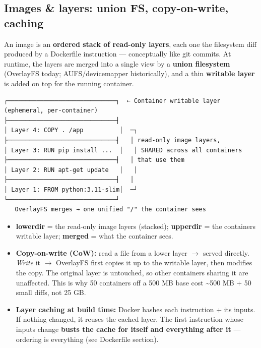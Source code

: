 \documentclass[11pt]{article}
\providecommand{\tightlist}{\setlength{\itemsep}{1pt}\setlength{\parskip}{0pt}}
\begin{document}
\subsection{Images \& layers: union FS, copy-on-write, caching}\label{images--layers-union-fs-copy-on-write-caching}

An image is an \textbf{ordered stack of read-only layers}, each one the filesystem diff produced by a Dockerfile instruction --- conceptually like git commits. At runtime, the layers are merged into a single view by a \textbf{union filesystem} (OverlayFS today; AUFS/devicemapper historically), and a thin \textbf{writable layer} is added on top for the running container.

\setcodelang{}

\begin{verbatim}
┌──────────────────────────────┐  ← Container writable layer (ephemeral, per-container)
├──────────────────────────────┤
│ Layer 4: COPY . /app          │  ─┐
├──────────────────────────────┤   │ read-only image layers,
│ Layer 3: RUN pip install ...  │   │ SHARED across all containers
├──────────────────────────────┤   │ that use them
│ Layer 2: RUN apt-get update   │   │
├──────────────────────────────┤   │
│ Layer 1: FROM python:3.11-slim│  ─┘
└──────────────────────────────┘
   OverlayFS merges → one unified "/" the container sees
\end{verbatim}

\begin{itemize}
\tightlist
\item
  \textbf{lowerdir} = the read-only image layers (stacked); \textbf{upperdir} = the container\textquotesingle s writable layer; \textbf{merged} = what the container sees.
\item
  \textbf{Copy-on-write (CoW):} read a file from a lower layer \(\rightarrow\) served directly. \emph{Write} it \(\rightarrow\) OverlayFS first copies it up to the writable layer, then modifies the copy. The original layer is untouched, so other containers sharing it are unaffected. This is why 50 containers off a 500 MB base cost \textasciitilde500 MB + 50 small diffs, not 25 GB.
\item
  \textbf{Layer caching at build time:} Docker hashes each instruction + its inputs. If nothing changed, it reuses the cached layer. The first instruction whose inputs change \textbf{busts the cache for itself and everything after it} --- ordering is everything (see Dockerfile section).
\end{itemize}
\end{document}
